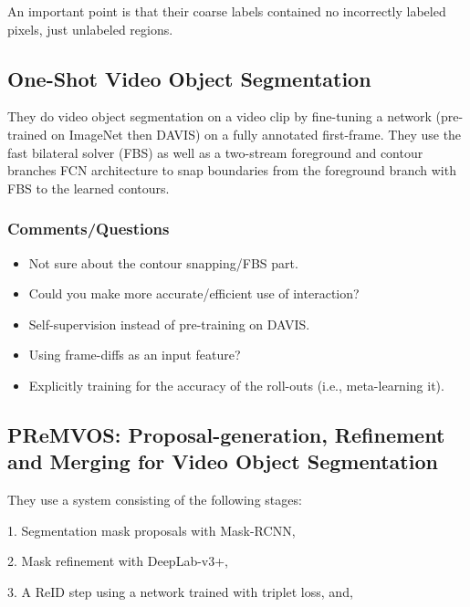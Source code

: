 \documentclass[a4paper, 12pt]{article}
\begin{document}
An important point is that their coarse labels contained no incorrectly labeled
pixels, just unlabeled regions.


\subsection{One-Shot Video Object Segmentation~\cite{caelles2017oneshot}}

They do video object segmentation on a video clip by fine-tuning a network
(pre-trained on ImageNet then DAVIS) on a fully annotated first-frame.
They use the fast bilateral solver (FBS) as well as a two-stream foreground and
contour branches FCN architecture to snap boundaries from the foreground branch
with FBS to the learned contours.

\subsubsection{Comments/Questions}

\begin{itemize}
        \item Not sure about the contour snapping/FBS part.

        \item Could you make more accurate/efficient use of interaction?

        \item Self-supervision instead of pre-training on DAVIS\@.

        \item Using frame-diffs as an input feature?

        \item Explicitly training for the accuracy of the roll-outs (i.e.,
                meta-learning it).
\end{itemize}


\subsection{PReMVOS: Proposal-generation, Refinement and Merging for Video
            Object Segmentation~\cite{luiten2018premvos}}

They use a system consisting of the following stages:

1. Segmentation mask proposals with Mask-RCNN,

2. Mask refinement with DeepLab-v3+,

3. A ReID step using a network trained with triplet loss, and,
\end{document}
